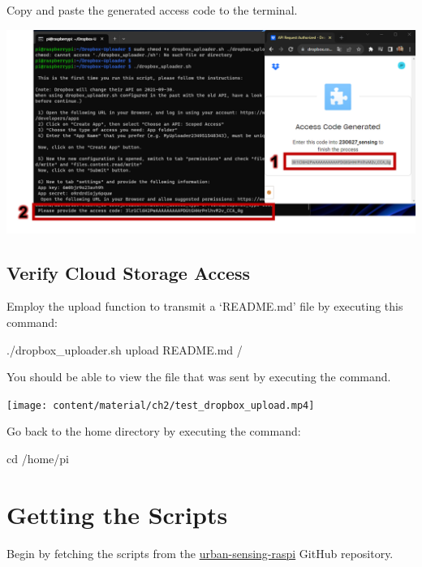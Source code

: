 \documentclass[
  letterpaper,
]{scrbook}
\newenvironment{Shaded}{\begin{snugshade}}{\end{snugshade}}
\newcommand{\BuiltInTok}[1]{\textcolor[rgb]{0.00,0.23,0.31}{#1}}
\newcommand{\ExtensionTok}[1]{\textcolor[rgb]{0.00,0.23,0.31}{#1}}
\newcommand{\NormalTok}[1]{\textcolor[rgb]{0.00,0.23,0.31}{#1}}
\begin{document}
Copy and paste the generated access code to the terminal.

\includegraphics{content/material/ch2/dropbox_register3.png}

\subsection{Verify Cloud Storage
Access}\label{verify-cloud-storage-access}

Employ the upload function to transmit a `README.md' file by executing
this command:

\begin{Shaded}
\begin{Highlighting}[]
\ExtensionTok{./dropbox\_uploader.sh}\NormalTok{ upload README.md /}
\end{Highlighting}
\end{Shaded}

You should be able to view the file that was sent by executing the
command.

\texttt{[image: content/material/ch2/test\_dropbox\_upload.mp4]}

Go back to the home directory by executing the command:

\begin{Shaded}
\begin{Highlighting}[]
\BuiltInTok{cd}\NormalTok{ /home/pi}
\end{Highlighting}
\end{Shaded}

\section{Getting the Scripts}\label{getting-the-scripts}

Begin by fetching the scripts from the
\href{https://github.com/urbanjuhyeon/urban-sensing-raspi}{urban-sensing-raspi}
GitHub repository.
\end{document}
